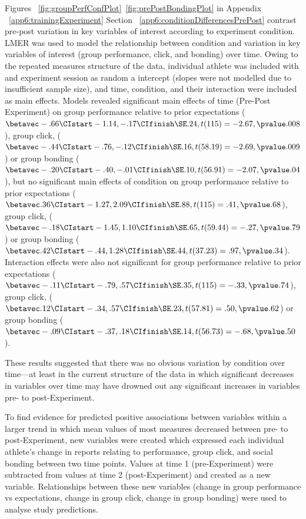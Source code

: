 Figures ~\ref{fig:groupPerfConfPlot}\nobreakdash~\ref{fig:prePostBondingPlot} in Appendix ~\ref{app6:trainingExperiment} Section ~\ref{app6:conditionDifferencesPrePost} contrast pre-post variation in key variables of interest according to experiment condition. LMER was used to model the relationship between condition and variation in key variables of interest (group performance, click, and bonding) over time. Owing to the repeated measures structure of the data, individual athlete was included with and experiment session as random a intercept (slopes were not modelled due to insufficient sample size), and time, condition, and their interaction were included as main effects. Models revealed significant main effects of time (Pre-Post Experiment) on group performance relative to prior expectations ($\betavec -.66 \CIstart -1.14, -.17 \CIfinish \SE .24, t(115) = -2.67, \pvalue .008 $), group click, ($\betavec -.44 \CIstart -.76, -.12 \CIfinish \SE .16, t(58.19) = -2.69, \pvalue .009 $) or group bonding ($\betavec -.20 \CIstart -.40, -.01 \CIfinish \SE .10, t(56.91) = -2.07, \pvalue .04$), but no significant main effects of condition on group performance relative to prior expectations ($\betavec .36 \CIstart -1.27, 2.09 \CIfinish \SE .88, t(115) = .41, \pvalue .68$), group click, ($\betavec -.18 \CIstart -1.45, 1.10 \CIfinish \SE .65, t(59.44) = -.27, \pvalue .79 $) or group bonding ($\betavec .42 \CIstart -.44, 1.28 \CIfinish \SE .44, t(37.23) = .97, \pvalue .34$).
Interaction effects were also not significant for group performance relative to prior expectations ($\betavec -.11 \CIstart -.79, .57 \CIfinish \SE .35, t(115) = -.33, \pvalue .74 $), group click, ($\betavec .12 \CIstart -.34, .57 \CIfinish \SE .23, t(57.81) = .50, \pvalue .62$) or group bonding ($\betavec -.09 \CIstart -.37, .18 \CIfinish \SE .14, t(56.73) = -.68, \pvalue .50$).

These results suggested that there was no obvious variation by condition over time---at least in the current structure of the data in which significant decreases in variables over time may have drowned out any significant increases in variables pre- to post-Experiment.


To find evidence for predicted positive associations between variables within a larger trend in which mean values of most measures decreased between pre- to post-Experiment, new variables were created which expressed each individual athlete's change in reports relating to performance, group click, and social bonding between two time points.  Values at time 1 (pre-Experiment) were subtracted from values at time 2 (post-Experiment) and created as a new variable.  Relationships between these new variables (change in group performance vs expectations, change in group click, change in group bonding) were used to analyse study predictions.



